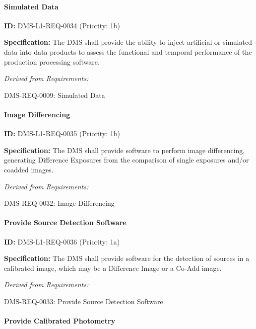 \documentclass[SE,toc,lsstdraft]{lsstdoc}
\begin{document}
\paragraph{Simulated Data}\hfill  %

\label{DMS-L1-REQ-0034}
\textbf{ID:} DMS-L1-REQ-0034 (Priority: 1b)

\textbf{Specification:} The DMS shall provide the ability to inject artificial or simulated data into data products to assess the functional and temporal performance of the production processing software.

\emph{Derived from Requirements:}

DMS-REQ-0009:
Simulated Data \newline

\paragraph{Image Differencing}\hfill  %

\label{DMS-L1-REQ-0035}
\textbf{ID:} DMS-L1-REQ-0035 (Priority: 1b)

\textbf{Specification:} The DMS shall provide software to perform image differencing, generating Difference Exposures from the comparison of single exposures and/or coadded images.

\emph{Derived from Requirements:}

DMS-REQ-0032:
Image Differencing \newline

\paragraph{Provide Source Detection Software}\hfill  %

\label{DMS-L1-REQ-0036}
\textbf{ID:} DMS-L1-REQ-0036 (Priority: 1a)

\textbf{Specification:} The DMS shall provide software for the detection of sources in a calibrated image, which may be a Difference Image or a Co-Add image.

\emph{Derived from Requirements:}

DMS-REQ-0033:
Provide Source Detection Software \newline

\paragraph{Provide Calibrated Photometry}\hfill  %
\end{document}
